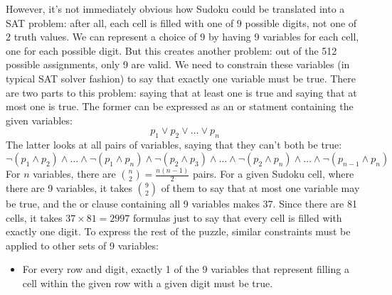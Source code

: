 \documentclass{article}
\begin{document}
However, it's not immediately obvious
how Sudoku could be translated into a SAT problem:
after all, each cell is filled with one of 9 possible digits,
not one of 2 truth values.
We can represent a choice of 9 by having 9 variables for each cell,
one for each possible digit.
But this creates another problem:
out of the 512 possible assignments, only 9 are valid.
We need to constrain these variables (in typical SAT solver fashion)
to say that exactly one variable must be true.
There are two parts to this problem:
saying that at least one is true
and saying that at most one is true.
The former can be expressed as an or statment containing the given variables:
\[p_1 \lor p_2 \lor \ldots \lor p_n\]
The latter looks at all pairs of variables,
saying that they can't both be true:
\[\lnot (p_1 \land p_2) \land \ldots \land \lnot (p_1 \land p_n)
\land \lnot (p_2 \land p_3) \land \ldots \land \lnot (p_2 \land p_n) \land \ldots
\land \lnot (p_{n-1} \land p_n)\]
For $n$ variables, there are $\binom{n}{2} = \frac{n(n-1)}{2}$ pairs.
For a given Sudoku cell, where there are 9 variables,
it takes $\binom{9}{2}$ of them
to say that at most one variable may be true,
and the or clause containing all 9 variables makes 37.
Since there are 81 cells,
it takes $37 \times 81 = 2997$ formulas
just to say that every cell is filled with exactly one digit.
To express the rest of the puzzle,
similar constraints must be applied to other sets of 9 variables:
\begin{itemize}
\item
  For every row and digit,
  exactly 1 of the 9 variables that represent
  filling a cell within the given row with a given digit
  must be true.
\end{itemize}
\end{document}
